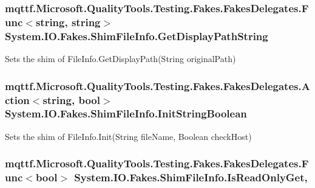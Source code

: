 \hypertarget{class_system_1_1_i_o_1_1_fakes_1_1_shim_file_info_ae0506f07a51f9c73a48cd41d6c3f7052}{
\subsubsection[{Get\-Display\-Path\-String}]{\setlength{\rightskip}{0pt plus 5cm}mqttf.\-Microsoft.\-Quality\-Tools.\-Testing.\-Fakes.\-Fakes\-Delegates.\-Func$<$string, string$>$ System.\-I\-O.\-Fakes.\-Shim\-File\-Info.\-Get\-Display\-Path\-String\hspace{0.3cm}{\ttfamily [set]}}}\label{class_system_1_1_i_o_1_1_fakes_1_1_shim_file_info_ae0506f07a51f9c73a48cd41d6c3f7052}


Sets the shim of File\-Info.\-Get\-Display\-Path(\-String original\-Path)

\hypertarget{class_system_1_1_i_o_1_1_fakes_1_1_shim_file_info_ae7037746106a352f36e9cb30b16d610e}{
\subsubsection[{Init\-String\-Boolean}]{\setlength{\rightskip}{0pt plus 5cm}mqttf.\-Microsoft.\-Quality\-Tools.\-Testing.\-Fakes.\-Fakes\-Delegates.\-Action$<$string, bool$>$ System.\-I\-O.\-Fakes.\-Shim\-File\-Info.\-Init\-String\-Boolean\hspace{0.3cm}{\ttfamily [set]}}}\label{class_system_1_1_i_o_1_1_fakes_1_1_shim_file_info_ae7037746106a352f36e9cb30b16d610e}


Sets the shim of File\-Info.\-Init(\-String file\-Name, Boolean check\-Host)

\hypertarget{class_system_1_1_i_o_1_1_fakes_1_1_shim_file_info_a2032dd9b8ddb913a0ccc474fab7427e0}{
\subsubsection[{Is\-Read\-Only\-Get}]{\setlength{\rightskip}{0pt plus 5cm}mqttf.\-Microsoft.\-Quality\-Tools.\-Testing.\-Fakes.\-Fakes\-Delegates.\-Func$<$bool$>$ System.\-I\-O.\-Fakes.\-Shim\-File\-Info.\-Is\-Read\-Only\-Get\hspace{0.3cm}{\ttfamily [get]}, {\ttfamily [set]}}}\label{class_system_1_1_i_o_1_1_fakes_1_1_shim_file_info_a2032dd9b8ddb913a0ccc474fab7427e0}


